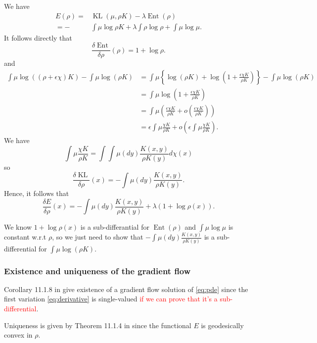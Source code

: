 \documentclass[a4paper]{article}
\DeclareMathOperator{\KL}{KL}
\DeclareMathOperator{\ent}{Ent}
\begin{document}
We have
\begin{align*}
E(\rho)= & \KL(\mu,\rho K)-\lambda\ent(\rho)\\
=- & \int\mu\log\rho K+\lambda\int\rho\log\rho+\int\mu\log\mu.
\end{align*}
It follows directly that 
\[
\frac{\delta\ent }{\delta\rho}\left(\rho\right)=1+\log\rho.
\]
and 
\begin{align*}
\int\mu\log\left(\left(\rho+\epsilon\chi\right)K\right)-\int\mu\log\left(\rho K\right) & =\int\mu\left\{ \log\left(\rho K\right)+\log\left(1+\frac{\epsilon\chi K}{\rho K}\right)\right\} -\int\mu\log\left(\rho K\right)\\
 & =\int\mu\log\left(1+\frac{\epsilon\chi K}{\rho K}\right)\\
 & =\int\mu\left(\frac{\epsilon\chi K}{\rho K}+o\left(\frac{\epsilon\chi K}{\rho K}\right)\right)\\
 & =\epsilon\int\mu\frac{\chi K}{\rho K}+o\left(\epsilon\int\mu\frac{\chi K}{\rho K}\right).
\end{align*}
We have 
\[
\int\mu\frac{\chi K}{\rho K}=\int\int\mu\left(dy\right)\frac{K(x,y)}{\rho K(y)}d\chi\left(x\right)
\]
so 
\[
\frac{\delta \KL}{\delta\rho}\left(x\right)=-\int\mu\left(dy\right)\frac{K(x,y)}{\rho K(y)}.
\]
Hence, it follows that 
\begin{equation}
\label{eq:derivative}
\frac{\delta E}{\delta\rho}\left(x\right)=-\int\mu\left(dy\right)\frac{K(x,y)}{\rho K(y)}+\lambda\left(1+\log\rho\left(x\right)\right).
\end{equation}

We know $1+\log\rho\left(x\right)$ is a sub-differantial for $\ent(\rho)$ and $\int \mu \log \mu$ is constant w.r.t $\rho$, so we just need to show that $-\int\mu\left(dy\right)\frac{K(x,y)}{\rho K(y)}$ is a sub-differential for $\int \mu\log(\rho K)$.

\subsubsection{Existence and uniqueness of the gradient flow}

Corollary 11.1.8 in \cite{ambrosio2008gradient} give existence of a gradient flow solution of \eqref{eq:pde} since the first variation \eqref{eq:derivative} is single-valued \textcolor{red}{if we can prove that it's a sub-differential}.

Uniqueness is given by Theorem 11.1.4 in \cite{ambrosio2008gradient} since the functional $E$ is geodesically convex in $\rho$.
\end{document}
